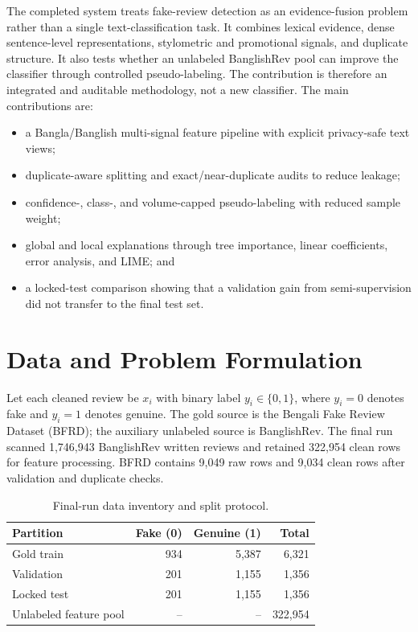 \documentclass[conference]{IEEEtran}
\begin{document}
The completed system treats fake-review detection as an evidence-fusion problem rather than a single text-classification task. It combines lexical evidence, dense sentence-level representations, stylometric and promotional signals, and duplicate structure. It also tests whether an unlabeled BanglishRev pool can improve the classifier through controlled pseudo-labeling. The contribution is therefore an integrated and auditable methodology, not a new classifier. The main contributions are:
\begin{itemize}
\item a Bangla/Banglish multi-signal feature pipeline with explicit privacy-safe text views;
\item duplicate-aware splitting and exact/near-duplicate audits to reduce leakage;
\item confidence-, class-, and volume-capped pseudo-labeling with reduced sample weight;
\item global and local explanations through tree importance, linear coefficients, error analysis, and LIME; and
\item a locked-test comparison showing that a validation gain from semi-supervision did not transfer to the final test set.
\end{itemize}

\section{Data and Problem Formulation}
Let each cleaned review be $x_i$ with binary label $y_i\in\{0,1\}$, where $y_i=0$ denotes fake and $y_i=1$ denotes genuine. The gold source is the Bengali Fake Review Dataset (BFRD); the auxiliary unlabeled source is BanglishRev. The final run scanned 1,746,943 BanglishRev written reviews and retained 322,954 clean rows for feature processing. BFRD contains 9,049 raw rows and 9,034 clean rows after validation and duplicate checks.

\begin{table}[t]
\caption{Final-run data inventory and split protocol.}
\label{tab:data}
\centering\footnotesize
\begin{tabular}{lrrr}
\toprule
Partition & Fake (0) & Genuine (1) & Total\\
\midrule
Gold train & 934 & 5,387 & 6,321\\
Validation & 201 & 1,155 & 1,356\\
Locked test & 201 & 1,155 & 1,356\\
Unlabeled feature pool & -- & -- & 322,954\\
\bottomrule
\end{tabular}
\end{table}
\end{document}
